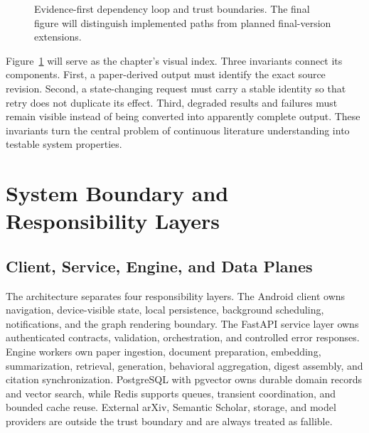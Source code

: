 \begin{figure}[htbp]
\centering
{}
\caption{Evidence-first dependency loop and trust boundaries. The final figure will distinguish implemented paths from planned final-version extensions.}
\label{fig:loop}
\end{figure}

Figure~\ref{fig:loop} will serve as the chapter's visual index. Three invariants connect its components. First, a paper-derived output must identify the exact source revision. Second, a state-changing request must carry a stable identity so that retry does not duplicate its effect. Third, degraded results and failures must remain visible instead of being converted into apparently complete output. These invariants turn the central problem of continuous literature understanding into testable system properties.

\section{System Boundary and Responsibility Layers}

\subsection{Client, Service, Engine, and Data Planes}

The architecture separates four responsibility layers.
The Android client owns navigation, device-visible state, local persistence, background scheduling, notifications, and the graph rendering boundary.
The FastAPI service layer owns authenticated contracts, validation, orchestration, and controlled error responses.
Engine workers own paper ingestion, document preparation, embedding, summarization, retrieval, generation, behavioral aggregation, digest assembly, and citation synchronization.
PostgreSQL with pgvector owns durable domain records and vector search, while Redis supports queues, transient coordination, and bounded cache reuse.
External arXiv, Semantic Scholar, storage, and model providers are outside the trust boundary and are always treated as fallible.

